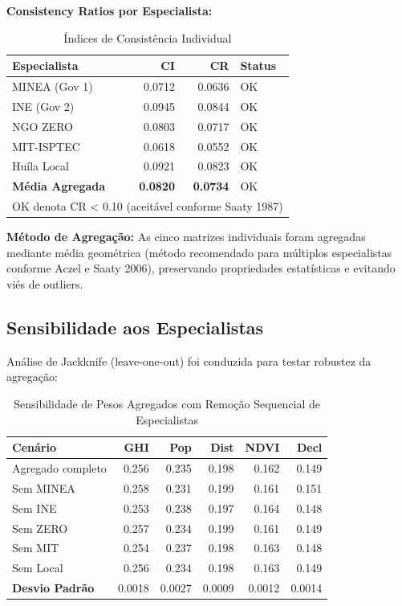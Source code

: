 \documentclass[12pt, a4paper]{article}
\begin{document}
\begin{itemize}
\textbf{Consistency Ratios por Especialista:}

\begin{table}[H]
\centering
\small
\caption{Índices de Consistência Individual}
\label{tab:cr_individual}
\begin{tabular}{|l|r|r|l|}
\hline
\textbf{Especialista} & \textbf{CI} & \textbf{CR} & \textbf{Status} \\
\hline
MINEA (Gov 1) & 0.0712 & 0.0636 & OK \\
INE (Gov 2) & 0.0945 & 0.0844 & OK \\
NGO ZERO & 0.0803 & 0.0717 & OK \\
MIT-ISPTEC & 0.0618 & 0.0552 & OK \\
Huíla Local & 0.0921 & 0.0823 & OK \\
\hline
\textbf{Média Agregada} & \textbf{0.0820} & \textbf{0.0734} & OK \\
\hline
\multicolumn{4}{|l|}{OK denota CR < 0.10 (aceitável conforme Saaty 1987)} \\
\hline
\end{tabular}
\end{table}

\textbf{Método de Agregação:} As cinco matrizes individuais foram agregadas mediante média geométrica (método recomendado para múltiplos especialistas conforme Aczel e Saaty 2006), preservando propriedades estatísticas e evitando viés de outliers.

\subsection{Sensibilidade aos Especialistas}

Análise de Jackknife (leave-one-out) foi conduzida para testar robustez da agregação:

\begin{table}[H]
\centering
\small
\caption{Sensibilidade de Pesos Agregados com Remoção Sequencial de Especialistas}
\label{tab:jackknife}
\begin{tabular}{|l|r|r|r|r|r|}
\hline
\textbf{Cenário} & \textbf{GHI} & \textbf{Pop} & \textbf{Dist} & \textbf{NDVI} & \textbf{Decl} \\
\hline
Agregado completo & 0.256 & 0.235 & 0.198 & 0.162 & 0.149 \\
Sem MINEA & 0.258 & 0.231 & 0.199 & 0.161 & 0.151 \\
Sem INE & 0.253 & 0.238 & 0.197 & 0.164 & 0.148 \\
Sem ZERO & 0.257 & 0.234 & 0.199 & 0.161 & 0.149 \\
Sem MIT & 0.254 & 0.237 & 0.198 & 0.163 & 0.148 \\
Sem Local & 0.256 & 0.234 & 0.198 & 0.163 & 0.149 \\
\hline
\textbf{Desvio Padrão} & 0.0018 & 0.0027 & 0.0009 & 0.0012 & 0.0014 \\
\hline
\end{tabular}
\end{table}


\end{itemize}
\end{document}
